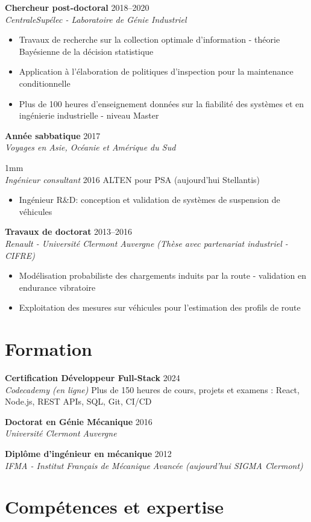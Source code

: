 \documentclass[10pt,a4paper]{article}
\newcommand{\resumeitem}[1]{\item\small{#1}}
\newcommand{\experience}[4]{
  \textbf{#1} \hfill \textcolor{mediumgray}{#2}\\
  \textit{\color{mediumgray}#3}%
  #4
  \vspace{1mm}
}
\begin{document}
\experience{Chercheur post-doctoral}{2018--2020}{CentraleSupélec - Laboratoire de Génie Industriel}{
\begin{itemize}
  \resumeitem{Travaux de recherche sur la collection optimale d'information - théorie Bayésienne de la décision statistique}
  \resumeitem{Application à l'élaboration de politiques d'inspection pour la maintenance conditionnelle}
  \resumeitem{Plus de 100 heures d'enseignement données sur la fiabilité des systèmes et en ingénierie industrielle - niveau Master}
\end{itemize}
}

\experience{Année sabbatique}{2017}{Voyages en Asie, Océanie et Amérique du Sud}


\experience{Ingénieur consultant}{2016}{ALTEN pour PSA (aujourd'hui Stellantis)}{
\begin{itemize}
\item Ingénieur R\&D: conception et validation de systèmes de suspension de véhicules
\end{itemize}
}

\experience{Travaux de doctorat}{2013--2016}{Renault - Université Clermont Auvergne (Thèse avec partenariat industriel - CIFRE)}{
\begin{itemize}
  \resumeitem{Modélisation probabiliste des chargements induits par la route - validation en endurance vibratoire}
  \resumeitem{Exploitation des mesures sur véhicules pour l'estimation des profils de route}
\end{itemize}
}

\section*{Formation}

\experience{Certification Développeur Full-Stack}{2024}{Codecademy (en ligne)}{\hspace{0.2cm}Plus de 150 heures de cours, projets et examens : React, Node.js, REST APIs, SQL, Git, CI/CD
}

\experience{Doctorat en Génie Mécanique}{2016}{Université Clermont Auvergne}{}

\experience{Diplôme d'ingénieur en mécanique}{2012}{IFMA - Institut Français de Mécanique Avancée (aujourd'hui SIGMA Clermont)}{}



\section*{Compétences et expertise}
\end{document}
